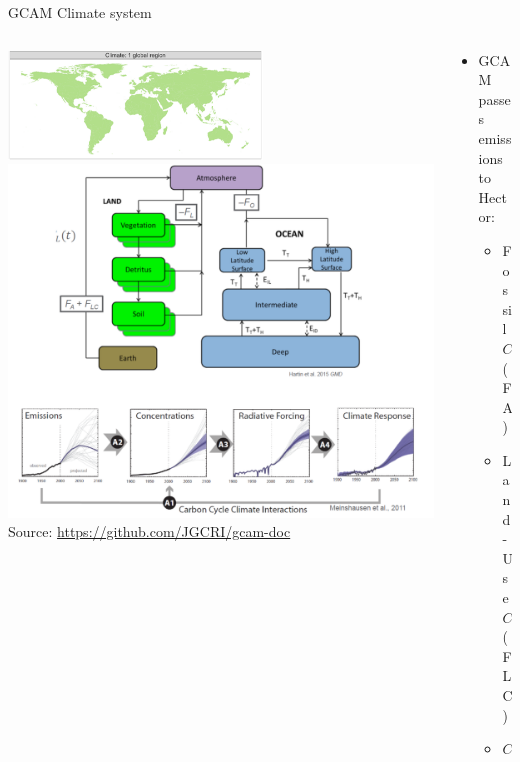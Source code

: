 \begin{frame}{GCAM Climate system}
    \begin{columns}[T] 
        \begin{column}{0.51\textwidth} 
            \centering     
            \includegraphics[width=0.6\textwidth]{extraFigs/GCAM_climate_system_breakout.png}
            \includegraphics[width=\textwidth]{extraFigs/GCAM_climate_system.png}
            \vfill\hfill \tiny{Source: \url{https://github.com/JGCRI/gcam-doc}}
        \end{column}
        \begin{column}{0.48\textwidth}
            \begin{itemize}
                \item GCAM passes emissions to Hector:
                \begin{multicols}{2}
                    \begin{itemize}
                        \item Fossil $CO_2$ (FA)
                        \item Land-Use $CO_2$ (FLC)
                        \item $CH_4$

\end{itemize}
\end{multicols}
\end{itemize}
\end{column}
\end{columns}
\end{frame}
